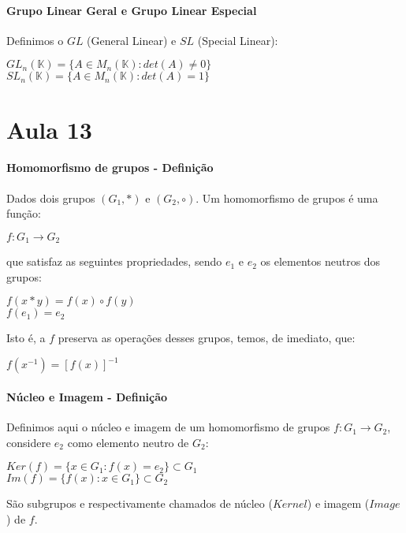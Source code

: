 \documentclass[12pt]{article}
\begin{document}
\paragraph{Grupo Linear Geral e Grupo Linear Especial\\}
	Definimos o $GL$ (General Linear) e $SL$ (Special Linear):
	\begin{center}
		$GL_n(\mathbb{K}) = \lbrace A \in M_n(\mathbb{K}): det(A) \neq 0 \rbrace$\\[5pt]
		$SL_n(\mathbb{K}) = \lbrace A \in M_n(\mathbb{K}): det(A) = 1 \rbrace$
	\end{center}
	
\newpage
\section*{Aula 13}
\paragraph{Homomorfismo de grupos - Definição\\}
	Dados dois grupos $(G_1,*)$ e $(G_2,\circ)$. Um homomorfismo de grupos é uma função:
	\begin{center} $f: G_1 \rightarrow G_2$ \end{center}
	que satisfaz as seguintes propriedades, sendo $e_1$ e $e_2$ os elementos neutros dos grupos:
	\begin{center} $f(x * y) = f(x) \circ f(y)$ \\ $f(e_1) = e_2$ \end{center}
	Isto é, a $f$ preserva as operações desses grupos, temos, de imediato, que:
	\begin{center} $f(x^{-1}) = [f(x)]^{-1}$ \end{center}

\paragraph{Núcleo e Imagem - Definição\\}
	Definimos aqui o núcleo e imagem de um homomorfismo de grupos $f: G_1 \rightarrow G_2$, considere $e_2$ como elemento neutro de $G_2$:
	\begin{center} 
		$Ker(f) = \lbrace x \in G_1: f(x) = e_2 \rbrace \subset G_1$\\[5pt]
		$Im(f) = \lbrace f(x): x \in G_1 \rbrace \subset G_2$
	\end{center}
	São subgrupos e respectivamente chamados de núcleo ($Kernel$) e imagem ($Image$) de $f$.
\end{document}
